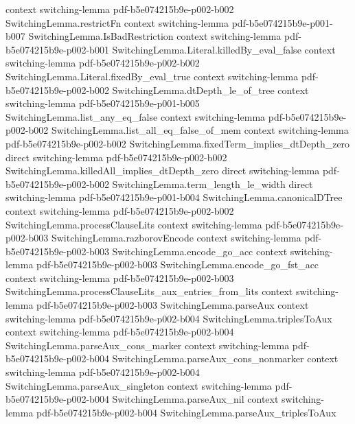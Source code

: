 \begin{lemma}
  {context}
  {switching-lemma}
  {pdf-b5e074215b9e-p002-b002}
\proofstep
  {SwitchingLemma.restrictFn}
  {context}
  {switching-lemma}
  {pdf-b5e074215b9e-p001-b007}
\proofstep
  {SwitchingLemma.IsBadRestriction}
  {context}
  {switching-lemma}
  {pdf-b5e074215b9e-p002-b001}
\proofstep
  {SwitchingLemma.Literal.killedBy_eval_false}
  {context}
  {switching-lemma}
  {pdf-b5e074215b9e-p002-b002}
\proofstep
  {SwitchingLemma.Literal.fixedBy_eval_true}
  {context}
  {switching-lemma}
  {pdf-b5e074215b9e-p002-b002}
\proofstep
  {SwitchingLemma.dtDepth_le_of_tree}
  {context}
  {switching-lemma}
  {pdf-b5e074215b9e-p001-b005}
\proofstep
  {SwitchingLemma.list_any_eq_false}
  {context}
  {switching-lemma}
  {pdf-b5e074215b9e-p002-b002}
\proofstep
  {SwitchingLemma.list_all_eq_false_of_mem}
  {context}
  {switching-lemma}
  {pdf-b5e074215b9e-p002-b002}
\proofstep
  {SwitchingLemma.fixedTerm_implies_dtDepth_zero}
  {direct}
  {switching-lemma}
  {pdf-b5e074215b9e-p002-b002}
\proofstep
  {SwitchingLemma.killedAll_implies_dtDepth_zero}
  {direct}
  {switching-lemma}
  {pdf-b5e074215b9e-p002-b002}
\proofstep
  {SwitchingLemma.term_length_le_width}
  {direct}
  {switching-lemma}
  {pdf-b5e074215b9e-p001-b004}
\proofstep
  {SwitchingLemma.canonicalDTree}
  {context}
  {switching-lemma}
  {pdf-b5e074215b9e-p002-b002}
\proofstep
  {SwitchingLemma.processClauseLits}
  {context}
  {switching-lemma}
  {pdf-b5e074215b9e-p002-b003}
\proofstep
  {SwitchingLemma.razborovEncode}
  {context}
  {switching-lemma}
  {pdf-b5e074215b9e-p002-b003}
\proofstep
  {SwitchingLemma.encode_go_acc}
  {context}
  {switching-lemma}
  {pdf-b5e074215b9e-p002-b003}
\proofstep
  {SwitchingLemma.encode_go_fst_acc}
  {context}
  {switching-lemma}
  {pdf-b5e074215b9e-p002-b003}
\proofstep
  {SwitchingLemma.processClauseLits_aux_entries_from_lits}
  {context}
  {switching-lemma}
  {pdf-b5e074215b9e-p002-b003}
\proofstep
  {SwitchingLemma.parseAux}
  {context}
  {switching-lemma}
  {pdf-b5e074215b9e-p002-b004}
\proofstep
  {SwitchingLemma.triplesToAux}
  {context}
  {switching-lemma}
  {pdf-b5e074215b9e-p002-b004}
\proofstep
  {SwitchingLemma.parseAux_cons_marker}
  {context}
  {switching-lemma}
  {pdf-b5e074215b9e-p002-b004}
\proofstep
  {SwitchingLemma.parseAux_cons_nonmarker}
  {context}
  {switching-lemma}
  {pdf-b5e074215b9e-p002-b004}
\proofstep
  {SwitchingLemma.parseAux_singleton}
  {context}
  {switching-lemma}
  {pdf-b5e074215b9e-p002-b004}
\proofstep
  {SwitchingLemma.parseAux_nil}
  {context}
  {switching-lemma}
  {pdf-b5e074215b9e-p002-b004}
\proofstep
  {SwitchingLemma.parseAux_triplesToAux}

\end{lemma}
